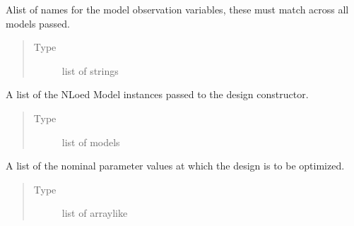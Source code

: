 \documentclass[letterpaper,10pt,english,openany,oneside]{sphinxmanual}
\begin{document}
\begin{fulllineitems}
\begin{fulllineitems}
\end{fulllineitems}


\begin{fulllineitems}
\label{\detokenize{nloed:nloed.design.Design.observ_name_list}}
Alist of names for the model observation variables, these
must match across all models passed.
\begin{quote}\begin{description}
\item[{Type}] \leavevmode
list of strings

\end{description}\end{quote}

\end{fulllineitems}


\begin{fulllineitems}
\label{\detokenize{nloed:nloed.design.Design.model_list}}
A list of the NLoed Model instances passed to the design
constructor.
\begin{quote}\begin{description}
\item[{Type}] \leavevmode
list of models

\end{description}\end{quote}

\end{fulllineitems}


\begin{fulllineitems}
\label{\detokenize{nloed:nloed.design.Design.param_list}}
A list of the nominal parameter values at which the design
is to be optimized.
\begin{quote}\begin{description}
\item[{Type}] \leavevmode
list of array\sphinxhyphen{}like


\end{description}
\end{quote}
\end{fulllineitems}
\end{fulllineitems}
\end{document}
